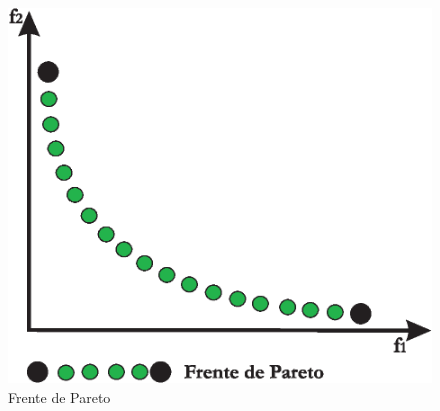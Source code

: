       \begin{figure}
	\centering
	\includegraphics[scale=0.65]{Cap2/1-2.eps}
	  \caption{Frente de Pareto}
      \label{fig:pareto}
      \end{figure}

